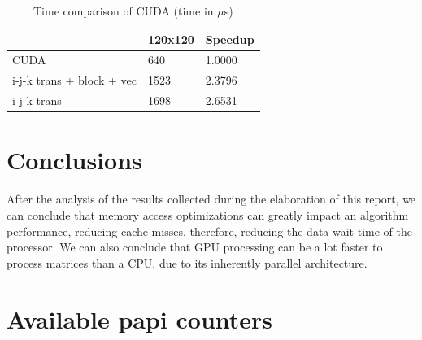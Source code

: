 \documentclass[a4paper]{report}
\begin{document}
\begin{table}[H]
\centering
\begin{tabular}{|l|l|l|}
\hline
                          & 120x120 & Speedup \\ \hline
CUDA                      & 640     & 1.0000  \\ \hline
i-j-k trans + block + vec & 1523    & 2.3796  \\ \hline
i-j-k trans               & 1698    & 2.6531  \\ \hline
\end{tabular}
\caption{Time comparison of CUDA (time in $\mu$s)}
\end{table}


\chapter{Conclusions}

After the analysis of the results collected during the elaboration of this
report, we can conclude that memory access optimizations can greatly
impact an algorithm performance, reducing cache misses, therefore, reducing the
data wait time of the processor.
We can also conclude that GPU processing can be a lot faster to process
matrices than a CPU, due to its inherently parallel architecture.

\appendix

\chapter{Available papi counters}\label{A:papi_avail}

\end{document}
